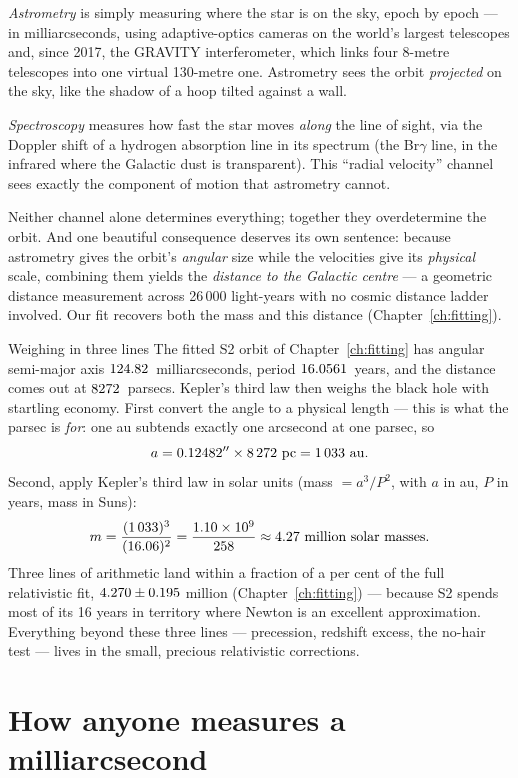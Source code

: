 \emph{Astrometry} is simply measuring where the star is on the sky, epoch
by epoch — in milliarcseconds, using adaptive-optics cameras on the
world's largest telescopes and, since 2017, the GRAVITY interferometer,
which links four 8-metre telescopes into one virtual 130-metre one.
Astrometry sees the orbit \emph{projected} on the sky, like the shadow
of a hoop tilted against a wall.

\emph{Spectroscopy} measures how fast the star moves \emph{along} the
line of sight, via the Doppler shift of a hydrogen absorption line in
its spectrum (the Br$\gamma$ line, in the infrared where the Galactic
dust is transparent). This ``radial velocity'' channel sees exactly the
component of motion that astrometry cannot.

Neither channel alone determines everything; together they overdetermine
the orbit. And one beautiful consequence deserves its own sentence:
because astrometry gives the orbit's \emph{angular} size while the
velocities give its \emph{physical} scale, combining them yields the
\emph{distance to the Galactic centre} — a geometric distance
measurement across 26\,000 light-years with no cosmic distance ladder
involved. Our fit recovers both the mass and this distance
(Chapter~\ref{ch:fitting}).

\begin{worked}{Weighing \sgra{} in three lines}
The fitted S2 orbit of Chapter~\ref{ch:fitting} has angular semi-major
axis $124.82$~milliarcseconds, period $16.0561$~years, and the
distance comes out at $8272$~parsecs. Kepler's third law then
weighs the black hole with startling economy. First convert the angle
to a physical length — this is what the parsec is \emph{for}: one au
subtends exactly one arcsecond at one parsec, so
\[
a = 0.12482'' \times 8\,272~{\rm pc} = 1\,033~{\rm au}.
\]
Second, apply Kepler's third law in solar units (mass $= a^3/P^2$, with
$a$ in au, $P$ in years, mass in Suns):
\[
m = \frac{(1\,033)^3}{(16.06)^2}
= \frac{1.10\times10^{9}}{258} \approx 4.27\ \hbox{million solar masses}.
\]
Three lines of arithmetic land within a fraction of a per cent of the
full relativistic fit, $4.270\pm0.195$ million
(Chapter~\ref{ch:fitting}) — because S2 spends most of its 16 years in
territory where Newton is an excellent approximation. Everything beyond
these three lines — precession, redshift excess, the no-hair test —
lives in the small, precious relativistic corrections.
\end{worked}

\section{How anyone measures a milliarcsecond}

